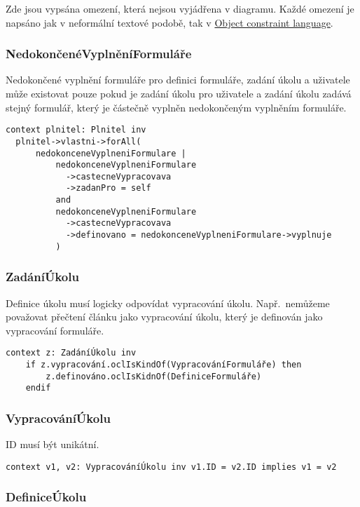 Zde jsou vypsána omezení, která nejsou vyjádřena v diagramu.
Každé omezení je napsáno jak v neformální textové podobě, tak v \href{https://www.omg.org/spec/OCL/2.4/About-OCL}{Object constraint language}.

\subsubsection{NedokončenéVyplněníFormuláře}

Nedokončené vyplnění formuláře pro definici formuláře, zadání úkolu a uživatele může existovat pouze pokud je zadání úkolu pro uživatele a zadání úkolu zadává stejný formulář, který je částečně vyplněn nedokončeným vyplněním formuláře.

\begin{verbatim}
context plnitel: Plnitel inv
  plnitel->vlastni->forAll(
      nedokonceneVyplneniFormulare |
          nedokonceneVyplneniFormulare
            ->castecneVypracovava
            ->zadanPro = self
          and
          nedokonceneVyplneniFormulare
            ->castecneVypracovava
            ->definovano = nedokonceneVyplneniFormulare->vyplnuje
          )
\end{verbatim}

\subsubsection{ZadáníÚkolu}

Definice úkolu musí logicky odpovídat vypracování úkolu.
Např.\ nemůžeme považovat přečtení článku jako vypracování úkolu, který je definován jako vypracování formuláře.

\begin{verbatim}
context z: ZadáníÚkolu inv
    if z.vypracování.oclIsKindOf(VypracováníFormuláře) then
        z.definováno.oclIsKidnOf(DefiniceFormuláře)
    endif
\end{verbatim}

\subsubsection{VypracováníÚkolu}

ID musí být unikátní.

\begin{verbatim}
context v1, v2: VypracováníÚkolu inv v1.ID = v2.ID implies v1 = v2
\end{verbatim}

\subsubsection{DefiniceÚkolu}

